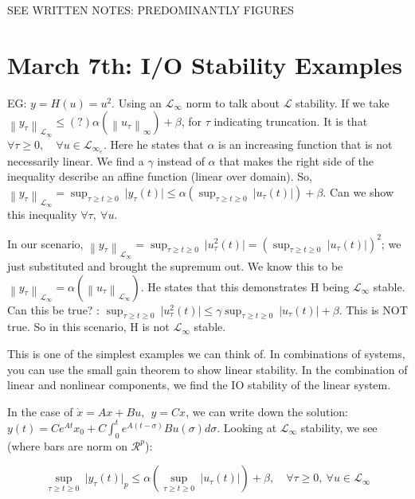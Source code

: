 \documentclass[11pt]{article}
\newcommand{\norm}[1]{\left\lVert#1\right\rVert}
\begin{document}
SEE WRITTEN NOTES: PREDOMINANTLY FIGURES


\section{March 7th: I/O Stability Examples}
EG: $y = H(u) = u^2$. Using an $\mathcal{L}_\infty$ norm to talk about $\mathcal{L}$ stability.
If we take $\norm{y_\tau}_{\mathcal{L}_\infty} \leq (?) \alpha(\norm{u_\tau}_\infty) + \beta$, for $\tau$ indicating truncation. It is that $\forall \tau \geq 0, \quad \forall u \in \mathcal{L}_{\infty_e}$. Here he states that $\alpha$ is an increasing function that is not necessarily linear. We find a $\gamma$ instead of $\alpha$ that makes the right side of the inequality describe an affine function (linear over domain). So, $\norm{y_\tau}_{\mathcal{L}_\infty} = \sup_{\tau \geq t \geq 0} \ \rvert y_\tau(t) \rvert \leq \alpha (\sup_{\tau \geq t \geq 0} \ \rvert u_\tau (t)\rvert) + \beta$. Can we show this inequality $\forall \tau, \ \forall u$.

In our scenario, $\norm{y_\tau}_{\mathcal{L}_\infty}  = \sup_{\tau \geq t \geq 0} \ \rvert u_\tau ^2(t)\rvert = (\sup_{\tau \geq t \geq 0} \ \rvert u_\tau(t)\rvert)^2$; we just substituted and brought the supremum out. We know this to be $\norm{y_\tau}_{\mathcal{L}_\infty} =\alpha(\norm{u_\tau}_{\mathcal{L}_\infty}) $. He states that this demonstrates H being $\mathcal{L}_\infty$ stable. Can this be true? : $\sup_{\tau \geq t \geq 0} \ \rvert u_\tau ^2 (t)\rvert \leq \gamma \sup_{\tau \geq t \geq 0} \ \rvert u_\tau(t) \rvert + \beta$. This is NOT true. So in this scenario, H is not $\mathcal{L}_\infty$ stable.

This is one of the simplest examples we can think of. In combinations of systems, you can use the small gain theorem to show linear stability. In the combination of linear and nonlinear components, we find the IO stability of the linear system.

In the case of $\dot{x} = Ax + Bu, \ \ y= Cx$, we can write down the solution: $y(t) = Ce^{At}x_0 + C \int_0^t e^{A(t-\sigma)} Bu(\sigma)d\sigma$. Looking at $\mathcal{L}_\infty$ stability, we see (where bars are norm on $\mathcal{R}^p$):

\begin{equation}
	\sup_{\tau \geq t \geq 0} \ \rvert y_\tau(t) \rvert_p \leq \alpha (\sup_{\tau \geq t \geq 0} \ \rvert u_\tau(t) \rvert) + \beta, \quad \forall \tau \geq 0, \ \forall u \in \mathcal{L}_\infty
\end{equation}
\end{document}

